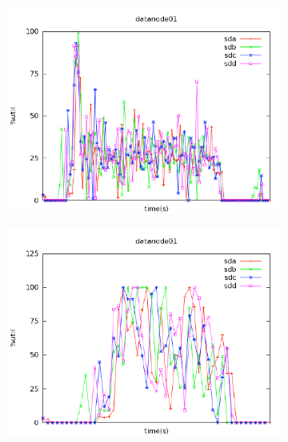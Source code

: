 \documentclass[preprint,12pt]{elsarticle}
\begin{document}
\begin{figure}[tbh]
    \centering
    \begin{subfigure}{0.5\textwidth}
        \includegraphics[width=\textwidth]{figure10a}
        \caption{}
        \label{figure10a}
    \end{subfigure}\begin{subfigure}{0.5\textwidth}
        \centering
        \includegraphics[width=\textwidth]{figure10b}%
        \caption{}
        \label{figure10b}
    \end{subfigure}
    \begin{subfigure}{0.5\textwidth}
        \centering

\end{subfigure}
\end{figure}
\end{document}
